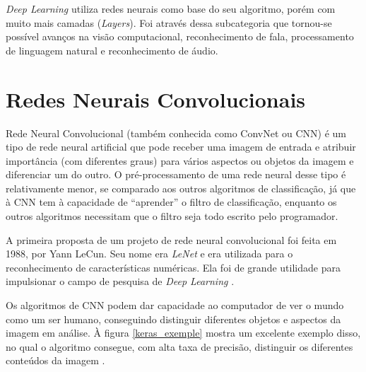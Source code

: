 \textit{Deep Learning} utiliza redes neurais como base do seu algoritmo, porém com muito mais camadas (\textit{Layers}). Foi através dessa subcategoria que tornou-se possível avanços na visão computacional, reconhecimento de fala, processamento de linguagem natural e reconhecimento de áudio.

\section{Redes Neurais Convolucionais}
\label{redes neurais convolucionais}

Rede Neural Convolucional (também conhecida como ConvNet ou CNN) é um tipo de rede neural artificial que pode receber uma imagem de entrada e atribuir importância (com diferentes graus) para vários aspectos ou objetos da imagem e diferenciar um do outro. O pré-processamento de uma rede neural desse tipo é relativamente menor, se comparado aos outros algoritmos de classificação, já que à CNN tem à capacidade de “aprender” o filtro de classificação, enquanto os outros algoritmos necessitam que o filtro seja todo escrito pelo programador\cite{redesneuraisconv,deeplearningbook}.

A primeira proposta de um projeto de rede neural convolucional foi feita em 1988, por Yann LeCun. Seu nome era \textit{LeNet} e era utilizada para o reconhecimento de características numéricas. Ela foi de grande utilidade para impulsionar o campo de pesquisa de \textit{Deep Learning} \cite{redesneuraisconv}.

Os algoritmos de CNN podem dar capacidade ao computador de ver o mundo como um ser humano, conseguindo distinguir diferentes objetos e aspectos da imagem em análise. À figura  \ref{keras_exemple} mostra um excelente exemplo disso, no qual  o algoritmo consegue, com alta taxa de precisão, distinguir os diferentes conteúdos da imagem \cite{conv1,conv2}.

\begin{figure}[H]
	\centering
\end{figure}

